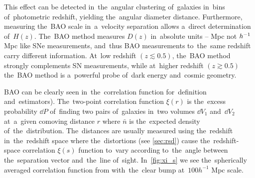 This effect can be detected in~the~angular clustering of~galaxies in~bins of~photometric redshift, yielding the~angular diameter distance. Furthermore, measuring the~BAO scale in~a~velocity separation allows a~direct determination of~$H(z)$. The~BAO method measures $D(z)$ in~absolute units -- Mpc not $h^{-1}$ Mpc like SNe measurements, and~thus BAO measurements to~the~same redshift carry different information. At~low redshift $(z\lesssim0.5)$, the~BAO method strongly complements SN measurements, while at~higher redshift $(z\gtrsim0.5)$ the~BAO method is a~powerful probe of~dark energy and~cosmic geometry.

BAO can be clearly seen in~the~correlation function \parencite[see e.g.][]{1993ApJ...412...64L} for~definition and~estimators). The~two-point correlation function $\xi(r)$ is the~excess probability $\dd P$ of~finding two pairs of~galaxies in~two volumes $\dd V_1$ and~$\dd V_2$ at~a~given comoving distance $r$
where $\bar{n}$ is the~expected density of~the~distribution. The~distances are usually measured using the~redshift in~the~redshift space where the~distortions (see \autoref{sec:rsd}) cause the~redshift-space correlation $\xi(s)$ function to~vary according to~the~angle between the~separation vector and~the~line of~sight. In~\autoref{fig:xi_s} we see the~spherically averaged correlation function from \textcite{2005ApJ...633..560E} with~the~clear bump at~$100h^{-1}$ Mpc scale.
